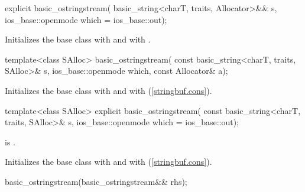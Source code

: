 %
\begin{itemdecl}
explicit basic_ostringstream(
  basic_string<charT, traits, Allocator>&& s,
  ios_base::openmode which = ios_base::out);
\end{itemdecl}

\begin{itemdescr}
\pnum
\effects
Initializes the base class with
and  with
.
\end{itemdescr}

%
\begin{itemdecl}
template<class SAlloc>
  basic_ostringstream(
    const basic_string<charT, traits, SAlloc>& s,
    ios_base::openmode which, const Allocator& a);
\end{itemdecl}

\begin{itemdescr}
\pnum
\effects
Initializes the base class with
and  with
\linebreak(\ref{stringbuf.cons}). %
\end{itemdescr}

%
\begin{itemdecl}
template<class SAlloc>
  explicit basic_ostringstream(
    const basic_string<charT, traits, SAlloc>& s,
    ios_base::openmode which = ios_base::out);
\end{itemdecl}

\begin{itemdescr}
\pnum
\constraints
{} is .

\pnum
\effects
Initializes the base class with
and  with
\linebreak(\ref{stringbuf.cons}). %
\end{itemdescr}

%
\begin{itemdecl}
basic_ostringstream(basic_ostringstream&& rhs);
\end{itemdecl}

